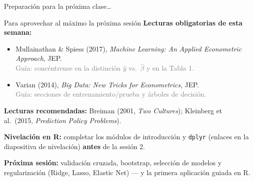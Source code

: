 \documentclass{beamer}
\newcommand{\1}{\mathbb{I}}
\begin{document}
\begin{frame}
\vspace{2.0cm}
\Large{Preparación para la próxima clase\ldots}
\end{frame}


\begin{frame}{Para aprovechar al máximo la próxima sesión}
\small
\textbf{Lecturas obligatorias de esta semana:}
\begin{itemize}\itemsep4pt
  \item Mullainathan \& Spiess (2017), \emph{Machine Learning: An Applied Econometric Approach}, JEP. \\ \textcolor{gray}{Guía: concéntrense en la distinción $\hat{y}$ vs.\ $\hat{\beta}$ y en la Tabla 1.}
  \item Varian (2014), \emph{Big Data: New Tricks for Econometrics}, JEP. \\ \textcolor{gray}{Guía: secciones de entrenamiento/prueba y árboles de decisión.}
\end{itemize}

\textbf{Lecturas recomendadas:} Breiman (2001, \emph{Two Cultures}); Kleinberg et al.\ (2015, \emph{Prediction Policy Problems}).
\pause

\vspace{0.2cm}
\textbf{Nivelación en R:} completar los módulos de introducción y \texttt{dplyr} (enlaces en la diapositiva de nivelación) \textbf{antes} de la sesión 2.
\pause

\vspace{0.2cm}
\textbf{Próxima sesión:} validación cruzada, bootstrap, selección de modelos y regularización (Ridge, Lasso, Elastic Net) --- y la primera aplicación guiada en R.
\end{frame}
\end{document}
